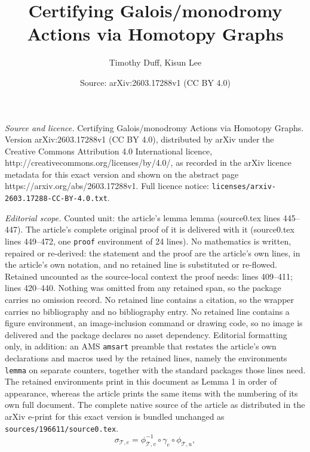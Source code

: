 \documentclass[10pt,a4paper]{amsart}
\title{Certifying Galois/monodromy Actions via Homotopy Graphs}
\author{Timothy Duff, Kisun Lee}
\date{Source: arXiv:2603.17288v1 (CC BY 4.0)}
\begin{document}
\maketitle

\noindent\emph{Source and licence.} Certifying Galois/monodromy Actions via Homotopy Graphs. Version arXiv:2603.17288v1 (CC BY 4.0), distributed by arXiv under the Creative Commons Attribution 4.0 International licence, http://creativecommons.org/licenses/by/4.0/, as recorded in the arXiv licence metadata for this exact version and shown on the abstract page https://arxiv.org/abs/2603.17288v1. Full licence notice: \texttt{licenses/arxiv-2603.17288-CC-BY-4.0.txt}.\par\smallskip

\noindent\textit{Editorial scope.} Counted unit: the article's lemma lemma (source0.tex lines 445--447). The article's complete original proof of it is delivered with it (source0.tex lines 449--472, one \texttt{proof} environment of 24 lines). No mathematics is written, repaired or re-derived: the statement and the proof are the article's own lines, in the article's own notation, and no retained line is substituted or re-flowed.  Retained uncounted as the source-local context the proof needs: lines 409--411; lines 420--440.  Nothing was omitted from any retained span, so the package carries no omission record.  No retained line contains a citation, so the wrapper carries no bibliography and no bibliography entry.  No retained line contains a figure environment, an image-inclusion command or drawing code, so no image is delivered and the package declares no asset dependency.  Editorial formatting only, in addition: an AMS \texttt{amsart} preamble that restates the article's own declarations and macros used by the retained lines, namely the environments \texttt{lemma} on separate counters, together with the standard packages those lines need.  The retained environments print in this document as Lemma 1 in order of appearance, whereas the article prints the same items with the numbering of its own full document.  The complete native source of the article as distributed in the arXiv e-print for this exact version is bundled unchanged as \texttt{sources/196611/source0.tex}.
\begin{equation}\label{eq:tree-permutations}
\sigma_{\mathcal{T}, e} = \phi_{\mathcal{T},v}^{-1} \circ \gamma_e \circ \phi_{\mathcal{T},u},
\end{equation}
\end{document}
